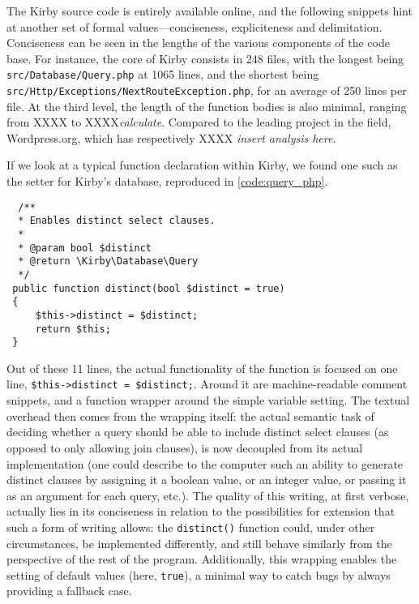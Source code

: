 The Kirby source code is entirely available online, and the following snippets hint at another set of formal values—conciseness, expliciteness and delimitation. Conciseness can be seen in the lengths of the various components of the code base. For instance, the core of Kirby consists in 248 files, with the longest being \lstinline{src/Database/Query.php} at 1065 lines, and the shortest being \lstinline{src/Http/Exceptions/NextRouteException.php}, for an average of 250 lines per file. At the third level, the length of the function bodies is also minimal, ranging from XXXX to XXXX\emph{calculate}. Compared to the leading project in the field, Wordpress.org, which has respectively XXXX \emph{insert analysis here}.

If we look at a typical function declaration within Kirby, we found one such as the  setter for Kirby's database, reproduced in \ref{code:query_php}.

\begin{listing}
  \begin{verbatim}
  /**
  * Enables distinct select clauses.
  *
  * @param bool $distinct
  * @return \Kirby\Database\Query
  */
 public function distinct(bool $distinct = true)
 {
     $this->distinct = $distinct;
     return $this;
 }
\end{verbatim}
  \caption{Query.php}
  \label{code:query_php}
\end{listing}

Out of these 11 lines, the actual functionality of the function is focused on one line, \lstinline{$this->distinct = $distinct;}. Around it are machine-readable comment snippets, and a function wrapper around the simple variable setting. The textual overhead then comes from the wrapping itself: the actual semantic task of deciding whether a query should be able to include distinct select clauses (as opposed to only allowing join clauses), is now decoupled from its actual implementation (one could describe to the computer such an ability to generate distinct clauses by assigning it a boolean value, or an integer value, or passing it as an argument for each query, etc.). The quality of this writing, at first verbose, actually lies in its conciseness in relation to the possibilities for extension that such a form of writing allows: the \lstinline{distinct()} function could, under other circumstances, be implemented differently, and still behave similarly from the perspective of the rest of the program. Additionally, this wrapping enables the setting of default values (here, \lstinline{true}), a minimal way to catch bugs by always providing a fallback case.

